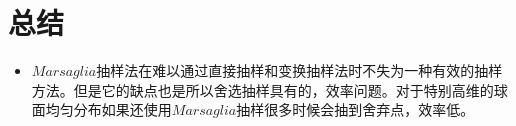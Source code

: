 \documentclass[UTF8]{ctexart}
\begin{document}
	\section{总结}
	\begin{itemize}
		\item $Marsaglia$抽样法在难以通过直接抽样和变换抽样法时不失为一种有效的抽样方法。但是它的缺点也是所以舍选抽样具有的，效率问题。对于特别高维的球面均匀分布如果还使用$Marsaglia$抽样很多时候会抽到舍弃点，效率低。
	\end{itemize}
	\clearpage
\end{document}
